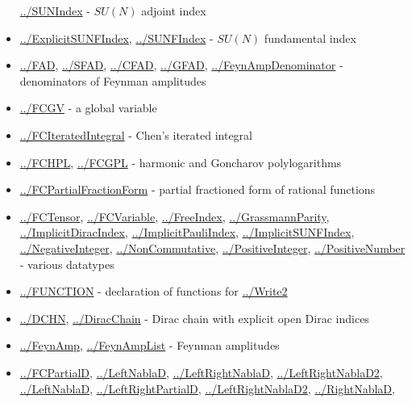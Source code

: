 \documentclass[../FeynCalcManual.tex]{subfiles}
\begin{document}
\begin{itemize}
  \hyperlink{../sunindex}{../SUNIndex} - \(SU(N)\) adjoint index
\item
  \hyperlink{../explicitsunfindex}{../ExplicitSUNFIndex},
  \hyperlink{../sunfindex}{../SUNFIndex} - \(SU(N)\) fundamental index
\item
  \hyperlink{../fad}{../FAD}, \hyperlink{../sfad}{../SFAD},
  \hyperlink{../cfad}{../CFAD}, \hyperlink{../gfad}{../GFAD},
  \hyperlink{../feynampdenominator}{../FeynAmpDenominator} -
  denominators of Feynman amplitudes
\item
  \hyperlink{../fcgv}{../FCGV} - a global variable
\item
  \hyperlink{../fciteratedintegral}{../FCIteratedIntegral} - Chen's
  iterated integral
\item
  \hyperlink{../fchpl}{../FCHPL}, \hyperlink{../fcgpl}{../FCGPL} -
  harmonic and Goncharov polylogarithms
\item
  \hyperlink{../fcpartialfractionform}{../FCPartialFractionForm} -
  partial fractioned form of rational functions
\item
  \hyperlink{../fctensor}{../FCTensor},
  \hyperlink{../fcvariable}{../FCVariable},
  \hyperlink{../freeindex}{../FreeIndex},
  \hyperlink{../grassmannparity}{../GrassmannParity},
  \hyperlink{../implicitdiracindex}{../ImplicitDiracIndex},
  \hyperlink{../implicitpauliindex}{../ImplicitPauliIndex},
  \hyperlink{../implicitsunfindex}{../ImplicitSUNFIndex},
  \hyperlink{../negativeinteger}{../NegativeInteger},
  \hyperlink{../noncommutative}{../NonCommutative},
  \hyperlink{../positiveinteger}{../PositiveInteger},
  \hyperlink{../positivenumber}{../PositiveNumber} - various datatypes
\item
  \hyperlink{../function}{../FUNCTION} - declaration of functions for
  \hyperlink{../write2}{../Write2}
\item
  \hyperlink{../dchn}{../DCHN}, \hyperlink{../diracchain}{../DiracChain}
  - Dirac chain with explicit open Dirac indices
\item
  \hyperlink{../feynamp}{../FeynAmp},
  \hyperlink{../feynamplist}{../FeynAmpList} - Feynman amplitudes
\item
  \hyperlink{../fcpartiald}{../FCPartialD},
  \hyperlink{../leftnablad}{../LeftNablaD},
  \hyperlink{../leftrightnablad}{../LeftRightNablaD},
  \hyperlink{../leftrightnablad2}{../LeftRightNablaD2},
  \hyperlink{../leftnablad}{../LeftNablaD},
  \hyperlink{../leftrightpartiald}{../LeftRightPartialD},
  \hyperlink{../leftrightnablad2}{../LeftRightNablaD2},
  \hyperlink{../rightnablad}{../RightNablaD},

\end{itemize}
\end{document}
